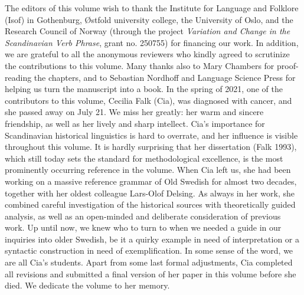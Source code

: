 The editors of this volume wish to thank the Institute for Language and Folklore (Isof) in Gothenburg, Østfold university college, the University of Oslo, and the Research Council of Norway (through the project \textit{Variation and Change in the Scandinavian Verb Phrase}, grant no. 250755) for financing our work. In addition, we are grateful to all the anonymous reviewers who kindly agreed to scrutinize the contributions to this volume. Many thanks also to Mary Chambers for proof-reading the chapters, and to Sebastian Nordhoff and Language Science Press for helping us turn the manuscript into a book.
In the spring of 2021, one of the contributors to this volume, Cecilia Falk (Cia), was diagnosed with cancer, and she passed away on July 21. We miss her greatly: her warm and sincere friendship, as well as her lively and sharp intellect. Cia’s importance for Scandinavian historical linguistics is hard to overrate, and her influence is visible throughout this volume. It is hardly surprising that her dissertation (Falk 1993), which still today sets the standard for methodological excellence, is the most prominently occurring reference in the volume. When Cia left us, she had been working on a massive reference grammar of Old Swedish for almost two decades, together with her oldest colleague Lars-Olof Delsing. As always in her work, she combined careful investigation of the historical sources with theoretically guided analysis, as well as an open-minded and deliberate consideration of previous work. Up until now, we knew who to turn to when we needed a guide in our inquiries into older Swedish, be it a quirky example in need of interpretation or a syntactic construction in need of exemplification. In some sense of the word, we are all Cia’s students.
Apart from some last formal adjustments, Cia completed all revisions and submitted a final version of her paper in this volume before she died. We dedicate the volume to her memory.